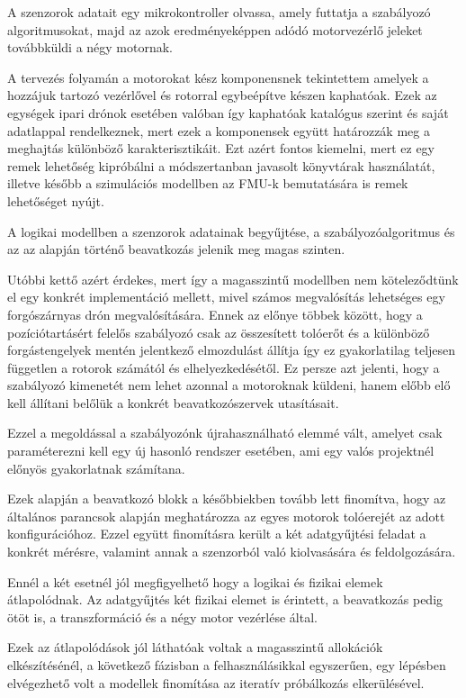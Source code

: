     A szenzorok adatait egy mikrokontroller olvassa, amely futtatja a szabályozó algoritmusokat, majd az azok eredményeképpen adódó motorvezérlő jeleket továbbküldi a négy motornak.
    
    A tervezés folyamán a motorokat kész komponensnek tekintettem amelyek a hozzájuk tartozó vezérlővel és rotorral egybeépítve készen kaphatóak. Ezek az egységek ipari drónok esetében valóban így kaphatóak katalógus szerint és saját adatlappal rendelkeznek, mert ezek a komponensek együtt határozzák meg a meghajtás különböző karakterisztikáit.
    Ezt azért fontos kiemelni, mert ez egy remek lehetőség kipróbálni a módszertanban javasolt könyvtárak használatát, illetve később a szimulációs modellben az FMU-k bemutatására is remek lehetőséget nyújt.
    
    A logikai modellben a szenzorok adatainak begyűjtése, a szabályozóalgoritmus és az az alapján történő beavatkozás jelenik meg magas szinten.
    
    Utóbbi kettő azért érdekes, mert így a magasszintű modellben nem köteleződtünk el egy konkrét implementáció mellett, mivel számos megvalósítás lehetséges egy forgószárnyas drón megvalósítására. Ennek az előnye többek között, hogy a pozíciótartásért felelős szabályozó csak az összesített tolóerőt és a különböző forgástengelyek mentén jelentkező elmozdulást állítja így ez gyakorlatilag teljesen független a rotorok számától és elhelyezkedésétől.
    Ez persze azt jelenti, hogy a szabályozó kimenetét nem lehet azonnal a motoroknak küldeni, hanem előbb elő kell állítani belőlük a konkrét beavatkozószervek utasításait.
    
    Ezzel a megoldással a szabályozónk újrahasználható elemmé vált, amelyet csak paraméterezni kell egy új hasonló rendszer esetében, ami egy valós projektnél előnyös gyakorlatnak számítana.
    
    Ezek alapján a beavatkozó blokk a későbbiekben tovább lett finomítva, hogy az általános parancsok alapján meghatározza az egyes motorok tolóerejét az adott konfigurációhoz. 
    Ezzel együtt finomításra került a két adatgyűjtési feladat a konkrét mérésre, valamint annak a szenzorból való kiolvasására és feldolgozására.
    
    Ennél a két esetnél jól megfigyelhető hogy a logikai és fizikai elemek átlapolódnak. Az adatgyűjtés két fizikai elemet is érintett, a beavatkozás pedig ötöt is, a transzformáció és a négy motor vezérlése által.
    
    Ezek az átlapolódások jól láthatóak voltak a magasszintű allokációk elkészítésénél, a következő fázisban a felhasználásikkal egyszerűen, egy lépésben elvégezhető volt a modellek finomítása az iteratív próbálkozás elkerülésével.



